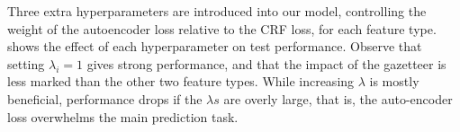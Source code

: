 Three extra hyperparameters are introduced into our model, controlling the weight of the autoencoder loss relative to the CRF loss, for each feature type.
 shows the effect of each hyperparameter on test performance. 
Observe that setting $\lambda_i=1$ gives strong performance, and that the impact of the gazetteer is less marked than the other two feature types. 
While increasing $\lambda$ is mostly beneficial, performance drops if the $\lambda s$ are overly large, that is, the auto-encoder loss overwhelms the main prediction task.
